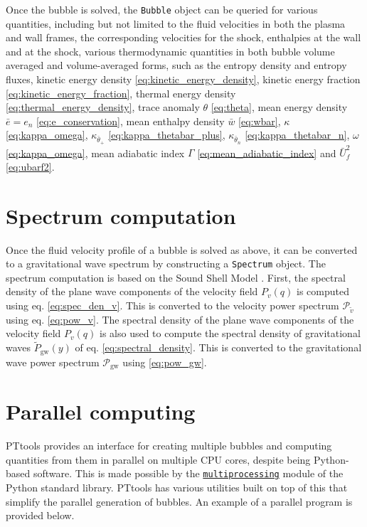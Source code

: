 Once the bubble is solved, the \verb|Bubble| object can be queried for various quantities,
including but not limited to the fluid velocities in both the plasma and wall frames,
the corresponding velocities for the shock,
enthalpies at the wall and at the shock,
various thermodynamic quantities in both bubble volume averaged and volume-averaged forms,
such as the entropy density and entropy fluxes,
kinetic energy density \eqref{eq:kinetic_energy_density},
kinetic energy fraction \eqref{eq:kinetic_energy_fraction},
thermal energy density \eqref{eq:thermal_energy_density},
trace anomaly $\theta$ \eqref{eq:theta},
mean energy density $\bar{e} = e_n$ \eqref{eq:e_conservation},
mean enthalpy density $\bar{w}$ \eqref{eq:wbar},
$\kappa$ \eqref{eq:kappa_omega},
$\kappa_{\bar{\theta}_+}$ \eqref{eq:kappa_thetabar_plus},
$\kappa_{\bar{\theta}_n}$ \eqref{eq:kappa_thetabar_n},
$\omega$ \eqref{eq:kappa_omega},
mean adiabatic index $\Gamma$ \eqref{eq:mean_adiabatic_index} and
$\bar{U}_f^2$ \eqref{eq:ubarf2}.


\section{Spectrum computation}
Once the fluid velocity profile of a bubble is solved as above,
it can be converted to a gravitational wave spectrum by constructing a \verb|Spectrum| object.
The spectrum computation is based on the Sound Shell Model \cite{hindmarsh_gw_pt_2019}.
First, the spectral density of the plane wave components of the velocity field $P_v(q)$ is computed using eq. \eqref{eq:spec_den_v}.
This is converted to the velocity power spectrum $\mathcal{P}_{\tilde{v}}$ using eq. \eqref{eq:pow_v}.
The spectral density of the plane wave components of the velocity field $P_v(q)$ is also used to compute the spectral density of gravitational waves $\tilde{P}_{\text{gw}}(y)$ of eq. \eqref{eq:spectral_density}.
This is converted to the gravitational wave power spectrum $\mathcal{P}_{\text{gw}}$ using \eqref{eq:pow_gw}.


\section{Parallel computing}
PTtools provides an interface for creating multiple bubbles and computing quantities from them in parallel on multiple CPU cores,
despite being Python-based software.
This is made possible by the
\href{https://docs.python.org/3/library/multiprocessing.html}{\texttt{multiprocessing}}
module of the Python standard library.
PTtools has various utilities built on top of this that simplify the parallel generation of bubbles.
An example of a parallel program is provided below.

